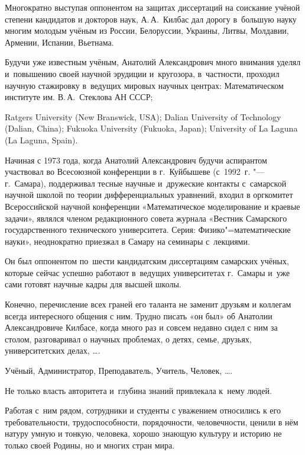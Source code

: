 Многократно выступая оппонентом на защитах диссертаций на соискание учёной степени кандидатов и докторов наук, А.\,А.~Килбас дал дорогу в~большую науку многим молодым учёным из России, Белоруссии, Украины, Литвы, Молдавии, Армении, Испании, Вьетнама. 

Будучи уже известным учёным, Анатолий Александрович много внимания уделял и~повышению своей научной эрудиции и~кругозора, в~частности, проходил научную стажировку в~ведущих мировых научных центрах: Математическом институте им. В.\,А.~Стеклова АН СССР; 

Ratgers University (New Branswick, USA); Dalian University of Technology (Dalian, China); Fukuoka University (Fukuoka, Japan); University of La Laguna (La Laguna, Spain).



Начиная с 1973 года, когда Анатолий Александрович будучи аспирантом участвовал во Всесоюзной конференции в г.~Куйбышеве (с~1992~г. "--- г.~Самара),  поддерживал тесные научные и~дружеские контакты с~самарской научной школой по теории дифференциальных уравнений, входил в оргкомитет Всероссийской научной конференции «Математическое моделирование и краевые задачи», являлся членом редакционного совета журнала «Вестник Самарского государственного технического университета. Серия: Физико"=математические науки», неоднократно приезжал в Самару на семинары с~лекциями. 

Он был оппонентом по~шести кандидатским диссертациям самарских учёных, которые сейчас успешно работают в~ведущих университетах г.~Самары и~уже сами готовят научные кадры для высшей школы.



Конечно, перечисление всех граней его таланта не заменит друзьям и коллегам всегда интересного общения с ним. Трудно писать «он был» об Анатолии Александровиче Килбасе, когда много раз и совсем недавно сидел с ним за столом, разговаривал о научных проблемах, о детях, семье, друзьях, университетских делах, \dots.



Учёный, Администратор, Преподаватель, Учитель, Человек, \dots. 

Не только власть авторитета и~глубина знаний привлекала к~нему людей. 

Работая с~ним рядом, сотрудники и студенты с уважением относились к его требовательности, трудоспособности, порядочности, человечности, ценили в нём натуру умную и тонкую, человека, хорошо знающую культуру и историю не только своей Родины, но и многих стран мира.



